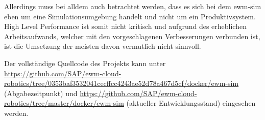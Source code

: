 Allerdings muss bei alldem auch betrachtet werden, dass es sich bei dem \ac{ewm-sim} eben um eine Simulationsumgebung handelt und nicht um ein Produktivsystem.
High Level Performance ist somit nicht kritisch und aufgrund des erheblichen Arbeitsaufwands, welcher mit den vorgeschlagenen Verbesserungen verbunden ist, ist die Umsetzung der meisten davon vermutlich nicht sinnvoll.

Der vollständige Quellcode des Projekts kann unter \url{https://github.com/SAP/ewm-cloud-robotics/tree/0353baf3532041cecffcc4243ae52d78a467d5cf/docker/ewm-sim} (Abgabezeitpunkt) und \url{https://github.com/SAP/ewm-cloud-robotics/tree/master/docker/ewm-sim} (aktueller Entwicklungsstand) eingesehen werden.